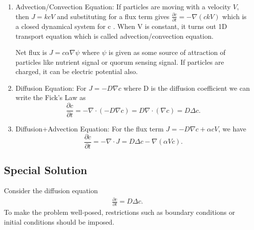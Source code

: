 \documentclass[]{article}
\numberwithin{equation}{section}		%
\def\bea{\begin{eqnarray}}
\def\ena{\end{eqnarray}}
\begin{document}
  \begin{enumerate}
  \item Advection/Convection Equation: If particles are moving with a velocity $V$, then $J= k c V$ and substituting for a flux term gives $\frac{\partial c}{\partial t} = -\nabla (c k V)$ which is a closed dynamical system for c . When V is constant, it turns out 1D transport equation which is called advection/convection equation.

Net flux is  $J=c \alpha \nabla \psi $ where $\psi$ is given as some source of attraction of particles like nutrient signal or quorum sensing signal. If particles are charged, it can be electric potential also.

\item Diffusion Equation: For $J= -D \nabla c$ where D is the diffusion coefficient we can write the Fick's Law as
\begin{equation}
\frac{\partial c}{\partial t}= -\nabla \cdot(-D \nabla c)= D \nabla\cdot(\nabla c)= D \Delta c.
\end{equation}

\item  Diffusion+Advection Equation:  For the flux term $J=-D \nabla c +\alpha c V$, we have
\begin{equation}
\frac{\partial c}{\partial t}= -\nabla \cdot J= D \Delta c -\nabla (\alpha V c).
\end{equation}
\end{enumerate}

\subsection{Special Solution}
Consider the diffusion equation
\bea
   \frac{\partial c}{\partial t} = D \Delta c.
\ena
To make the problem well-posed, restrictions such as boundary conditions or initial conditions should be imposed.
\end{document}
